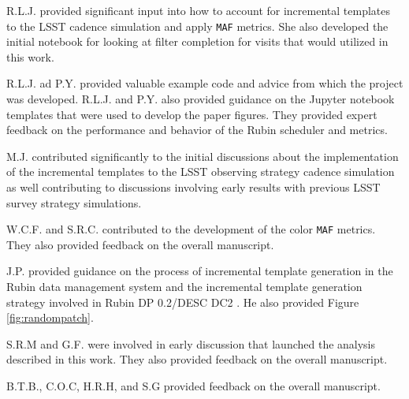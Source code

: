 \documentclass[preprintm,linenumbers]{aastex631}
\begin{document}
R.L.J. provided significant input into how to account for incremental templates to the LSST cadence simulation and apply \texttt{MAF} metrics. She also developed the initial notebook for looking at filter completion for visits that would utilized in this work. 

R.L.J. ad P.Y. provided valuable example code and advice from which the project was developed. R.L.J. and P.Y. also provided guidance on the Jupyter notebook templates that were used to develop the paper figures. They provided expert feedback on the performance and behavior of the Rubin scheduler and metrics.

M.J. contributed significantly to the initial discussions about the implementation of the incremental templates to the LSST observing strategy cadence simulation as well contributing to discussions involving early results with previous LSST survey strategy simulations. 

W.C.F. and S.R.C. contributed to the development of the color \texttt{MAF} metrics. They also provided feedback on the overall manuscript. 

J.P. provided guidance on the process of incremental template generation in the Rubin data management system and the incremental template generation strategy involved in Rubin DP 0.2/DESC DC2 . He also provided Figure \ref{fig:randompatch}.

S.R.M and G.F. were involved in early discussion that launched the analysis described in this work. They also provided feedback on the overall manuscript. 

B.T.B., C.O.C, H.R.H, and S.G provided feedback on the overall manuscript. 




\end{document}
